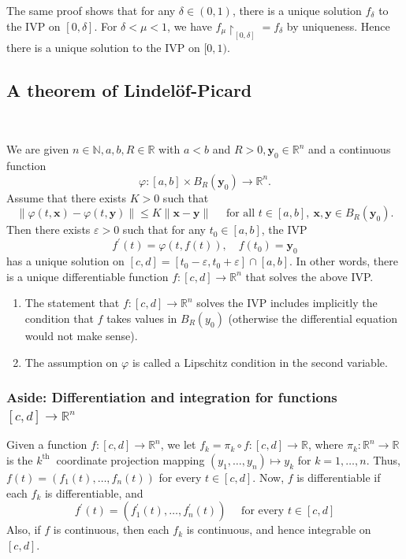 \documentclass[a4paper]{article}
\begin{document}
\begin{remark}
    The same proof shows that for any $\delta \in(0,1)$, there is a unique solution $f_\delta$ to the IVP on $[0, \delta]$. For $\delta<\mu<1$, we have $f_\mu\restriction_{[0, \delta]}=f_\delta$ by uniqueness. Hence there is a unique solution to the IVP on $[0,1)$.
\end{remark}

\subsection{A theorem of Lindel\"{o}f-Picard}\ \vspace{-1.5em}
\begin{theorem}\label{thm:21}
    We are given $n \in \mathbb{N}, a, b, R \in \mathbb{R}$ with $a<b$ and $R>0, \mathbf{y}_0 \in \mathbb{R}^n$ and a continuous function
    \[
    \varphi:[a, b] \times B_R\left(\mathbf{y}_0\right) \rightarrow \mathbb{R}^n.
    \]
    Assume that there exists $K>0$ such that
    \[
    \|\varphi(t, \mathbf x)-\varphi(t, \mathbf y)\| \leqslant K\|\mathbf x-\mathbf y\| \quad \text { for all } t \in[a, b],\ \mathbf x, \mathbf y \in B_R\left(\mathbf y_0\right).
    \]
    Then there exists $\varepsilon>0$ such that for any $t_0 \in[a, b]$, the IVP
    \[
    f^{\prime}(t)=\varphi(t, f(t)), \quad f(t_0)=\mathbf y_0
    \]
    has a unique solution on $[c, d]=\left[t_0-\varepsilon, t_0+\varepsilon\right] \cap[a, b]$. In other words, there is a unique differentiable function $f:[c, d] \rightarrow \mathbb{R}^n$ that solves the above IVP.
\end{theorem}
\begin{note}
    \begin{enumerate}
        \item The statement that $f:[c, d] \rightarrow \mathbb{R}^n$ solves the IVP includes implicitly the condition that $f$ takes values in $B_R\left(y_0\right)$ (otherwise the differential equation would not make sense).
        \item The assumption on $ \varphi $ is called a Lipschitz condition in the second variable.
    \end{enumerate}
\end{note}
\subsubsection*{Aside: Differentiation and integration for functions $ [c,d]\to \mathbb{R}^{n} $}
Given a function $f:[c, d] \rightarrow \mathbb{R}^n$, we let $f_k=\pi_k \circ f:[c, d] \rightarrow \mathbb{R}$, where $\pi_k: \mathbb{R}^n \rightarrow \mathbb{R}$ is the $k^{\text {th }}$ coordinate projection mapping $\left(y_1, \ldots, y_n\right) \mapsto y_k$ for $k=1, \ldots, n$. Thus, $f(t)=\left(f_1(t), \ldots, f_n(t)\right)$ for every $t \in[c, d]$.
Now, $f$ is differentiable if each $f_k$ is differentiable, and
\[
f^{\prime}(t)=\left(f_1^{\prime}(t), \ldots, f_n^{\prime}(t)\right) \quad \text { for every } t \in[c, d]
\]
Also, if $f$ is continuous, then each $f_k$ is continuous, and hence integrable on $[c, d]$. 
\end{document}
